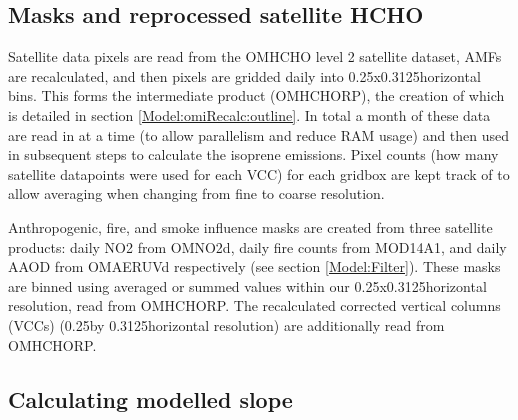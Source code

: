   
  \subsection{Masks and reprocessed satellite HCHO}
    
    Satellite data pixels are read from the OMHCHO level 2 satellite dataset, AMFs are recalculated, and then pixels are gridded daily into 0.25x0.3125\degr horizontal bins. 
    This forms the intermediate product (OMHCHORP), the creation of which is detailed in section \ref{Model:omiRecalc:outline}.
    In total a month of these data are read in at a time (to allow parallelism and reduce RAM usage) and then used in subsequent steps to calculate the isoprene emissions.
    Pixel counts (how many satellite datapoints were used for each VCC) for each gridbox are kept track of to allow averaging when changing from fine to coarse resolution.
    
    Anthropogenic, fire, and smoke influence masks are created from three satellite products: daily NO2 from OMNO2d, daily fire counts from MOD14A1, and daily AAOD from OMAERUVd respectively (see section \ref{Model:Filter}). 
    These masks are binned using averaged or summed values within our 0.25x0.3125\degr horizontal resolution, read from OMHCHORP.
    The recalculated corrected vertical columns (VCCs) (0.25\degr by 0.3125\degr horizontal resolution) are additionally read from OMHCHORP. %
    
    
  \subsection{Calculating modelled slope}
    \label{BioIsop:Method:slope}
    
